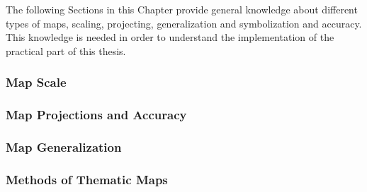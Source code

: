 The following Sections in this Chapter provide general knowledge about different types of maps, scaling, projecting, generalization and symbolization and accuracy. This knowledge is needed in order to understand the implementation of the practical part of this thesis.

\subsubsection{Map Scale}
\label{s:map-scale}


\subsubsection{Map Projections and Accuracy}

\label{s:map-projections}

\subsubsection{Map Generalization}


\subsubsection{Methods of Thematic Maps}

